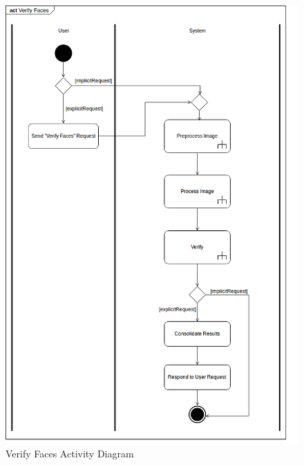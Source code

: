 \documentclass{article}
\begin{document}
	\begin{figure}[!h]
		\centering
		\includegraphics[scale=0.455]{img/verify_faces_activity.png}
		\caption{Verify Faces Activity Diagram}
	\end{figure}
\pagebreak
\end{document}
